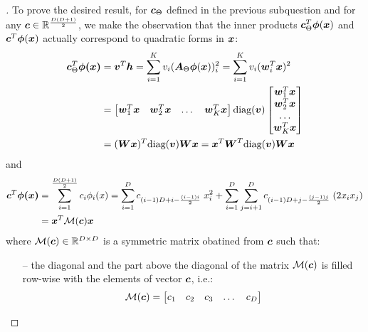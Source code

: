 \documentclass{exam}
\begin{document}
\begin{questions}
        \question
        \begin{proof}[\unskip\nopunct]
        To prove the desired result, for $\vb*{c}_{\Theta}$ defined in the previous subquestion and for any $\vb*{c} \in \mathbb{R}^{\frac{D(D + 1)}{2}}$, we make the observation that the inner products $\vb*{c}_{\Theta}^T  \vb*{\phi}(\vb*{x})$ and $\vb*{c}^T  \vb*{\phi}(\vb*{x})$ actually correspond to quadratic forms in $\vb*{x}$:
        \begin{align*}
            \vb*{c}_{\Theta}^T \vb*{\phi(x)} &= \vb*{v}^T \vb*{h} = \sum_{i = 1}^K v_i (\vb*{A}_{\Theta} \vb*{\phi}(\vb*{x}))^2_i = 
            \sum_{i = 1}^K v_i (\vb*{w}_i^T \vb*{x})^2 \\
            &= 
            \begin{bmatrix}
                \vb*{w}_1^T \vb*{x} & \vb*{w}_2^T \vb*{x} & \dots & \vb*{w}_K^T \vb*{x}
            \end{bmatrix}
            \text{diag}(\vb*{v})
            \begin{bmatrix}
                \vb*{w}_1^T \vb*{x} \\ \vb*{w}_2^T \vb*{x} \\ \dots \\ \vb*{w}_K^T \vb*{x}
            \end{bmatrix} \\
            &= (\vb*{Wx})^T \text{diag}(\vb*{v}) \vb*{Wx} 
             = \vb*{x}^T \vb*{W}^T \text{diag}(\vb*{v}) \vb*{Wx} 
        \end{align*}
        and 
        \begin{align*}
            \vb*{c}^T \vb*{\phi(x)} &= \sum_{i = 1}^{\frac{D(D + 1)}{2}} c_i \phi_i(x) = \sum_{i = 1}^{D} c_{(i - 1)D + i - \frac{(i - 1)i}{2}}\; x_i^2 + \sum_{i = 1}^{D}\sum_{j = i + 1}^{D} c_{(i - 1)D + j - \frac{(j - 1)j}{2}}\;(2 x_i x_j) \\
            &= \vb*{x}^T \mathcal{M}(\vb*{c}) \vb*{x}
        \end{align*}
        where $\mathcal{M}(\vb*{c}) \in \mathbb{R}^{D \times D}$ is a symmetric matrix obatined from $\vb*{c}$ such that:
        \begin{itemize}
            \item[--] the diagonal and the part above the diagonal of the matrix $\mathcal{M}(\vb*{c})$ is filled row-wise with the elements of vector $\vb*{c}$, i.e.:
            \[
                \mathcal{M}(\vb*{c}) = 
                \begin{bmatrix}
                    c_1 & c_2 & c_3 & \dots & c_D \\

\end{bmatrix}\]
\end{itemize}
\end{proof}
\end{questions}
\end{document}
